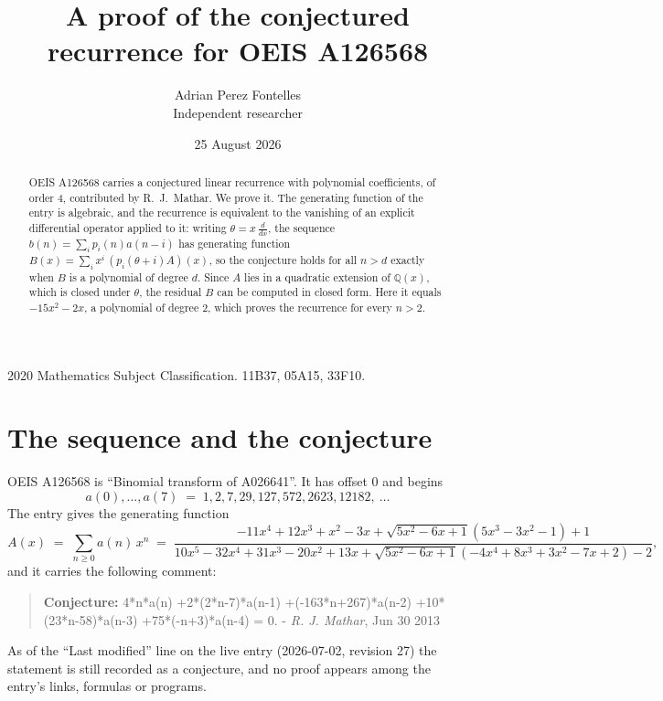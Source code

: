 \documentclass[11pt,a4paper]{article}
\title{A proof of the conjectured recurrence for OEIS A126568}
\author{Adrian Perez Fontelles\\ \small Independent researcher}
\date{25 August 2026}
\theoremstyle{plain}
\theoremstyle{definition}
\begin{document}
\maketitle

\begin{abstract}
OEIS A126568 carries a conjectured linear recurrence with polynomial coefficients, of
order 4, contributed by R.~J.~Mathar. We prove it. The generating function of the
entry is algebraic, and the recurrence is equivalent to the vanishing of an explicit
differential operator applied to it: writing $\theta=x\,\frac{d}{dx}$, the sequence
$b(n)=\sum_{i}p_{i}(n)a(n-i)$ has generating function
$B(x)=\sum_{i}x^{i}\,(p_{i}(\theta+i)A)(x)$, so the conjecture holds for all $n>d$ exactly
when $B$ is a polynomial of degree $d$. Since $A$ lies in a quadratic extension of
$\mathbb{Q}(x)$, which is closed under $\theta$, the residual $B$ can be computed in
closed form. Here it equals $- 15 x^{2} - 2 x$, a polynomial of degree $2$, which proves
the recurrence for every $n>2$.
\end{abstract}

\noindent\small 2020 Mathematics Subject Classification. 11B37, 05A15, 33F10.\normalsize

\section{The sequence and the conjecture}

OEIS A126568 is ``Binomial transform of A026641''. It has offset $0$ and begins
\[
a(0),\dots,a(7)\;=\;1, 2, 7, 29, 127, 572, 2623, 12182,\ \dots
\]
The entry gives the generating function
\begin{equation}\label{eq:gf}
A(x)\;=\;\sum_{n\ge 0} a(n)\,x^{n}\;=\;\frac{- 11 x^{4} + 12 x^{3} + x^{2} - 3 x + \sqrt{5 x^{2} - 6 x + 1} \left(5 x^{3} - 3 x^{2} - 1\right) + 1}{10 x^{5} - 32 x^{4} + 31 x^{3} - 20 x^{2} + 13 x + \sqrt{5 x^{2} - 6 x + 1} \left(- 4 x^{4} + 8 x^{3} + 3 x^{2} - 7 x + 2\right) - 2} ,
\end{equation}
and it carries the following comment:
\begin{quote}\small
\textbf{Conjecture:} 4*n*a(n) +2*(2*n-7)*a(n-1) +(-163*n+267)*a(n-2) +10*(23*n-58)*a(n-3) +75*(-n+3)*a(n-4) = 0. - \emph{R. J. Mathar}, Jun 30 2013
\end{quote}
As of the ``Last modified'' line on the live entry (2026-07-02, revision 27) the
statement is still recorded as a conjecture, and no proof appears among the entry's links,
formulas or programs.
\end{document}
